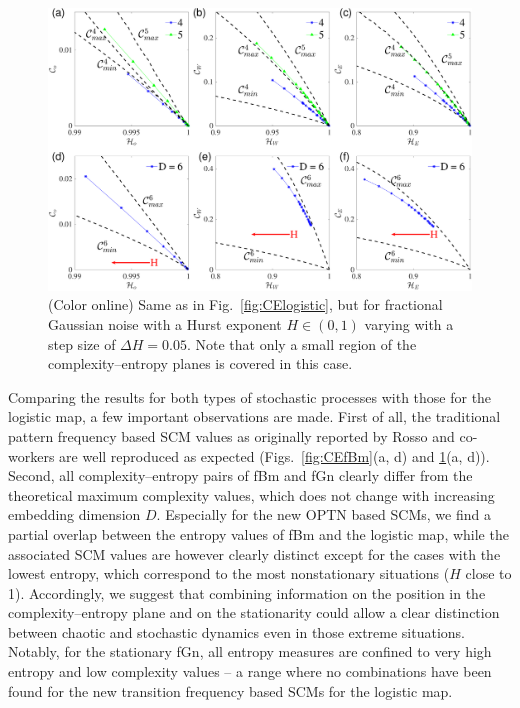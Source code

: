 \documentclass[12pt,aip,cha,reprint,nofootinbib]{revtex4-1}
\begin{document}
\begin{figure}
	\centering 
	\includegraphics[width=2\columnwidth]{CompEntropy_fGn.pdf}
\caption{\small{(Color online) Same as in Fig.~\ref{fig:CElogistic}, but for fractional Gaussian noise with a Hurst exponent $H \in (0, 1)$ varying with a step size of $\Delta H=0.05$. Note that only a small region of the complexity--entropy planes is covered in this case. }  \label{fig:CEfGn}}
\end{figure}

Comparing the results for both types of stochastic processes with those for the logistic map, a few important observations are made. First of all, the traditional pattern frequency based SCM values as originally reported by Rosso and co-workers \cite{RossoPRE2007,rossoPRL2007} are well reproduced as expected (Figs.~\ref{fig:CEfBm}(a, d) and \ref{fig:CEfGn}(a, d)). Second, all complexity--entropy pairs of fBm and fGn clearly differ from the theoretical maximum complexity values, which does not change with increasing embedding dimension $D$. Especially for the new OPTN based SCMs, we find a partial overlap between the entropy values of fBm and the logistic map, while the associated SCM values are however clearly distinct except for the cases with the lowest entropy, which correspond to the most nonstationary situations ($H$ close to 1). Accordingly, we suggest that combining information on the position in the complexity--entropy plane and on the stationarity could allow a clear distinction between chaotic and stochastic dynamics even in those extreme situations. Notably, for the stationary fGn, all entropy measures are confined to very high entropy and low complexity values -- a range where no combinations have been found for the new transition frequency based SCMs for the logistic map. 
\end{document}
